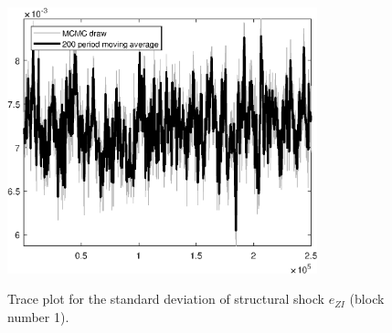 \begin{figure}[H]
\centering
  \includegraphics[width=0.8\textwidth]{BRS_growth_ext_util/graphs/TracePlot_SE_e_ZI_blck_1}\\
    \caption{Trace plot for the standard deviation of structural shock ${e_{ZI}}$ (block number 1).}
\end{figure}
